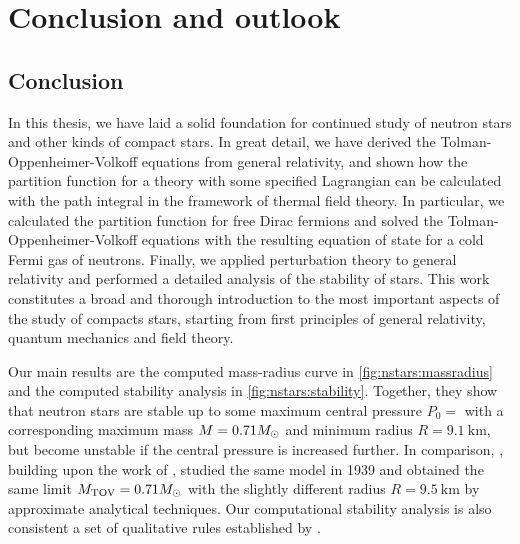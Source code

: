 \chapter{Conclusion and outlook}
\label{chap:conclusion}



\section{Conclusion}

In this thesis, we have laid a solid foundation for continued study of neutron stars and other kinds of compact stars.
In great detail, we have derived the Tolman-Oppenheimer-Volkoff equations from general relativity, and shown how the partition function for a theory with some specified Lagrangian can be calculated with the path integral in the framework of thermal field theory.
In particular, we calculated the partition function for free Dirac fermions and solved the Tolman-Oppenheimer-Volkoff equations with the resulting equation of state for a cold Fermi gas of neutrons.
Finally, we applied perturbation theory to general relativity and performed a detailed analysis of the stability of stars.
This work constitutes a broad and thorough introduction to the most important aspects of the study of compacts stars, starting from first principles of general relativity, quantum mechanics and field theory.

Our main results are the computed mass-radius curve in \cref{fig:nstars:massradius} and the computed stability analysis in \cref{fig:nstars:stability}.
Together, they show that neutron stars are stable up to some maximum central pressure $P_0 = $ \TODO{} with a corresponding maximum mass $M = 0.71 M_\odot$ and minimum radius $R = \SI{9.1}{\kilo\meter}$, but become unstable if the central pressure is increased further.
In comparison, \cite{ref:tov}, building upon the work of \cite{ref:tolman}, studied the same model in 1939 and obtained the same limit $M_\text{TOV} = 0.71 M_\odot$ with the slightly different radius $R = \SI{9.5}{\kilo\meter}$ by approximate analytical techniques.
Our computational stability analysis is also consistent a set of qualitative rules established by \cite{ref:stability_methods}.

